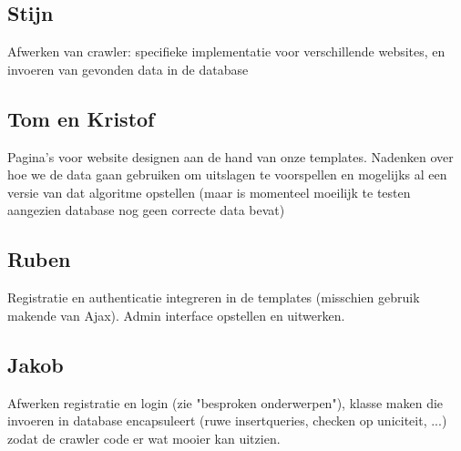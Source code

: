 \documentclass[11pt, a4paper]{article}
\begin{document}
\subsection{Stijn}
Afwerken van crawler: specifieke implementatie voor verschillende websites, en invoeren van gevonden data in de database
\subsection{Tom en Kristof}
Pagina's voor website designen aan de hand van onze templates. Nadenken over hoe we de data gaan gebruiken om uitslagen te voorspellen en mogelijks al een versie van dat algoritme opstellen (maar is momenteel moeilijk te testen aangezien database nog geen correcte data bevat)
\subsection{Ruben}
Registratie en authenticatie integreren in de templates (misschien gebruik makende van Ajax). Admin interface opstellen en uitwerken.
\subsection{Jakob}
Afwerken registratie en login (zie "besproken onderwerpen"), klasse maken die invoeren in database encapsuleert (ruwe insertqueries, checken op uniciteit, ...) zodat de crawler code er wat mooier kan uitzien.
\end{document}
